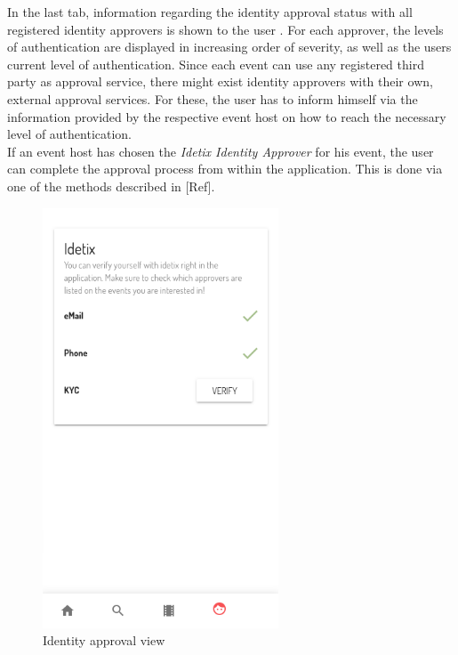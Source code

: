 In the last tab, information regarding the identity approval status with all registered identity approvers is shown to the user . For each approver, the levels of authentication are displayed in increasing order of severity, as well as the users current level of authentication. Since each event can use any registered third party as approval service, there might exist identity approvers with their own, external approval services. For these, the user has to inform himself via the information provided by the respective event host on how to reach the necessary level of authentication. \\
If an event host has chosen the \textit{Idetix Identity Approver} for his event, the user can complete the approval process from within the application. This is done via one of the methods described in [Ref]. 
\begin{figure}[H]
    \centering
    \includegraphics[width=7cm]{images/ide_1.png}
    \caption{Identity approval view}
    \label{img:identity}
\end{figure}

